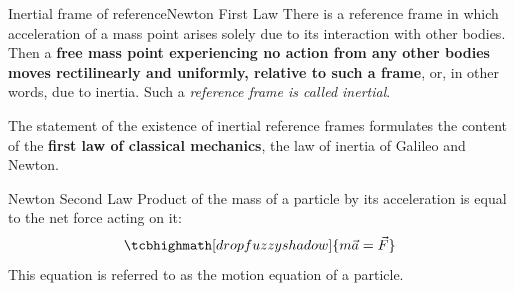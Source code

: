 \documentclass[18pt]{LectMechanics}
\begin{document}
\begin{frame}{Inertial frame of reference}{Newton First Law}
	There is a reference frame
	in which acceleration of a mass point arises solely due to its
	interaction with other bodies. Then a \textbf{free mass point
		experiencing no action from any other bodies moves rectilinearly and uniformly, relative to such a frame}, or, in other
	words, due to inertia. Such a \emph{reference frame is called inertial}.

	The statement of the existence of inertial reference
	frames formulates the content of the \textbf{first law of classical
		mechanics}, the law of inertia of Galileo and Newton.
\end{frame}


\begin{frame}{Newton Second Law}{}
	Product of the mass of a particle by its acceleration is equal to the net force acting on it:
	\begin{equation*}
		\tcbhighmath[drop fuzzy shadow]{m\vec a = \vec F}
	\end{equation*}
	This equation is referred to as the motion equation of a particle.

\end{frame}
\end{document}
